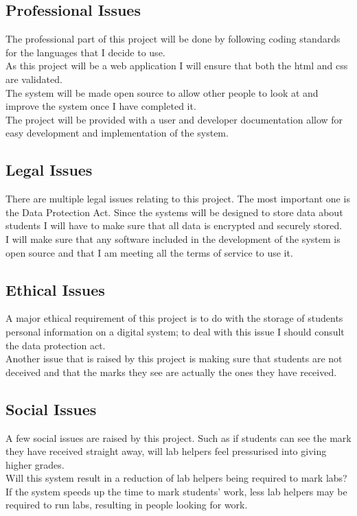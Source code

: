 \documentclass[12pt]{article}  %
\begin{document}
\newpage

\subsection{Professional Issues}
The professional part of this project will be done by following coding standards for the languages that I decide to use.\\
As this project will be a web application I will ensure that both the html and css are validated.\\
The system will be made open source to allow other people to look at and improve the system once I have completed it.\\
The project will be provided with a  user and developer documentation allow for easy development and implementation of the system.


\subsection{Legal Issues}
There are multiple legal issues relating to this project. The most important one is the Data Protection Act. Since the systems will be designed to store data about students I will have to make sure that all data is encrypted and securely stored.\\
I will make sure that any software included in the development of the system is open source and that I am meeting all the terms of service to use it.\\



\subsection{Ethical Issues}
A major ethical requirement of this project is to do with the storage of students personal information on a digital system; to deal with this issue I should consult the data protection act. \\
Another issue that is raised by this project is making sure that students are not deceived and that the marks they see are actually the ones they have received.


\subsection{Social Issues}
A few social issues are raised by this project. Such as if students can see the mark they have received straight away, will lab helpers feel pressurised into giving higher grades.\\
Will this system result in a reduction of lab helpers being required to mark labs? If the system speeds up the time to mark students’ work, less lab helpers may be required to run labs, resulting in people looking for work.







\newpage
\printbibliography
\end{document}
